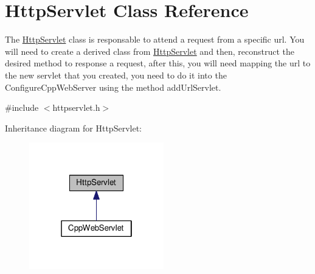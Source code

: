 \hypertarget{class_http_servlet}{}\section{Http\+Servlet Class Reference}
\label{class_http_servlet}


The \hyperlink{class_http_servlet}{Http\+Servlet} class is responsable to attend a request from a specific url. You will need to create a derived class from \hyperlink{class_http_servlet}{Http\+Servlet} and then, reconstruct the desired method to response a request, after this, you will need mapping the url to the new servlet that you created, you need to do it into the Configure\+Cpp\+Web\+Server using the method add\+Url\+Servlet.  




{\ttfamily \#include $<$httpservlet.\+h$>$}



Inheritance diagram for Http\+Servlet\+:\nopagebreak
\begin{figure}[H]
\begin{center}
\leavevmode
\includegraphics[width=166pt]{class_http_servlet__inherit__graph}
\end{center}
\end{figure}
